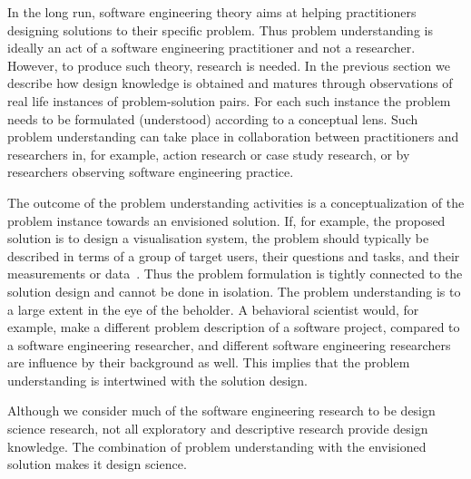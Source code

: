 \documentclass[graybox]{svmult}
\begin{document}


In the long run, software engineering theory aims at helping practitioners designing solutions to their specific problem. Thus problem understanding is ideally an act of a software engineering practitioner and not a researcher. However, to produce such theory, research is needed. In the previous section we describe how design knowledge is obtained and matures through observations of real life instances of problem-solution pairs. For each such instance the problem needs to be formulated (understood) according to a conceptual lens. Such problem understanding can take place in collaboration between practitioners and researchers in, for example, action research or case study research, or by researchers observing software engineering practice.


The outcome of the problem understanding activities is a conceptualization of the problem instance towards an envisioned solution. If, for example, the proposed solution is to design a visualisation system, the problem should typically be described in terms of a group of target users, their questions and tasks, and their measurements or data~\cite{meyer_nested_2015}. Thus the problem formulation is tightly connected to the solution design and cannot be done in isolation. The problem understanding is to a large extent in the eye of the beholder. A behavioral scientist would, for example,  make a different problem description of a software project, compared to a software engineering researcher, and different software engineering researchers are influence by their background as well. This implies that the problem understanding is intertwined with the solution design.

Although we consider much of the software engineering research to be design science research, not all exploratory and descriptive research provide design knowledge. The combination of problem understanding with the envisioned solution makes it design science.

\end{document}
